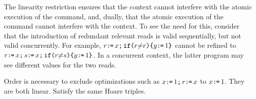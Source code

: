 The linearity restriction ensures that the context cannot interfere with the
atomic execution of the command, and, dually, that the atomic execution of
the command cannot interfere with the context.  To see the need for this,
consider that the introduction of redundant relevant reads is valid sequentially, but
not valid concurrently. For example,
$r \texttt{:}\mkern-1mu\texttt{=}\, x \texttt{;}\,\allowbreak \texttt{if}\allowbreak\texttt{(}r {\neq} r\texttt{)}\allowbreak\texttt{\{} y \texttt{:}\mkern-1mu\texttt{=}\, 1 \texttt{\}}$
cannot be refined to
$r \texttt{:}\mkern-1mu\texttt{=}\, x \texttt{;}\,\allowbreak s \texttt{:}\mkern-1mu\texttt{=}\, x \texttt{;}\,\allowbreak \texttt{if}\allowbreak\texttt{(}r {\neq} s\texttt{)}
\allowbreak\texttt{\{} y \texttt{:}\mkern-1mu\texttt{=}\, 1 \texttt{\}}$.  In a concurrent context, the latter program may
see different values for the two reads.

Order is necessary to exclude optimizations such as
$x\texttt{:}\mkern-1mu\texttt{=}\, 1 \texttt{;}\,\allowbreak r \texttt{:}\mkern-1mu\texttt{=}\, x$ to $x\texttt{:}\mkern-1mu\texttt{=}\, 1$. They are both linear. Satisfy the
same Hoare triples.  

\endinput 




\subsection{Full abstraction for synchronization free threads}
Our semantics is complete for reasoning about full-thread optimizations of synchronization free programs.

In the rest of this section, we only consider commands $\aCmd,\bCmd$ that are
restriction-free, composition-free (ie. single-threaded), and
synchronization-free (ie. no acquire, release, fence).

In order to develop the proof, 

This closure permits us to  describe a normal form for the top-level pomsets that arise in single-threaded and synchronization free code.  
\begin{definition}
$\aPS$ is in normal form if:
\begin{itemize}
\item If $\bEv \lt \aEv$ and  $\bEv$ is a write, then $\aEv$ is a write or read on the same variable.
\item If $\bEv \lt \aEv$ and  $\aEv$ is a read, then $\bEv$ is a write on the same variable. 
    
\item If $\aEv, \aEv'$ have the same read action label, then there exists a write $\bEv$ on the same location such that $\aEv \gtN \bEv \gtN \aEv'$.
\end{itemize}
\end{definition}
In a normal form pomset, the successors of a write event (resp. the predecessors of a read) are related in the coherence order to the event.  Any two events with the same read label are separated by a write in the $\reco$ order. 

